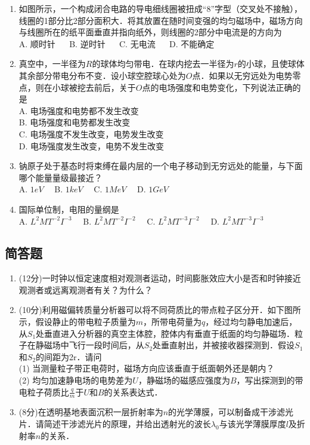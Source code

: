 \begin{enumerate}
\item 如图所示，一个构成闭合电路的导电细线圈被扭成“8”字型（交叉处不接触），线圈的1部分比2部分面积大．将其放置在随时间变强的均匀磁场中，磁场方向与线圈所在的纸平面垂直并指向纸外，则线圈的2部分中电流是的方向为\\
A. 顺时针 $\quad$
B. 逆时针 $\quad$
C. 无电流 $\quad$
D. 不能确定 $\quad$

\item 真空中，一半径为$R$的球体均匀带电．在球内挖去一半径为$r$的小球，且使球体其余部分带电分布不变．设小球空腔球心处为$O$点．如果以无穷远处为电势零点，则在小球被挖去前后，关于$O$点的电场强度和电势变化，下列说法正确的是\\
A. 电场强度和电势都不发生改变 \\
B. 电场强度和电势都发生改变 \\
C. 电场强度不发生改变，电势发生改变 \\
D. 电场强度发生改变，电势不发生改变 \\
\item 钠原子处于基态时将束缚在最内层的一个电子移动到无穷远处的能量，与下面哪个能量量级最接近？\\
A. $1eV\quad$
B. $1keV\quad$
C. $1MeV\quad$
D. $1GeV\quad$
\item 国际单位制，电阻的量纲是\\
A. $L^{2}MT^{-2}I^{-3}\quad$
B. $L^{2}MT^{-2}I^{-2}\quad$
C. $L^{2}MT^{-3}I^{-2}\quad$
D. $L^{2}MT^{-3}I^{-3}\quad$
\end{enumerate}
\subsection{简答题}
\begin{enumerate}
\item (12分)一时钟以恒定速度相对观测者运动，时间膨胀效应大小是否和时钟接近观测者或远离观测者有关？为什么？
\item (10分)利用磁偏转质量分析器可以将不同荷质比的带点粒子区分开．如下图所示，假设静止的带电粒子质量为$m$，所带电荷量为$q$，经过均匀静电加速后，从$S_{1}$处垂直进入分析器的真空主体腔，腔体内有垂直于纸面的均匀静磁场．粒子在静磁场中飞行一段时间后，从$S_{2}$处垂直射出，并被接收器探测到．假设$S_{1}$和$S_{2}$的间距为2r．请问\\
(1) 当测量粒子带正电荷时，磁场方向应该垂直于纸面朝外还是朝内？\\
(2) 均匀加速静电场的电势差为$U$，静磁场的磁感应强度为$B$，写出探测到的带电粒子荷质比$\frac{q}{m}$于$U$和$B$的关系表达式．
\item (8分)在透明基地表面沉积一层折射率为$n$的光学薄膜，可以制备成干涉滤光片．请简述干涉滤光片的原理，并给出透射光的波长$\lambda_{0}$与该光学薄膜厚度$l$及折射率$n$的关系．
\end{enumerate}
